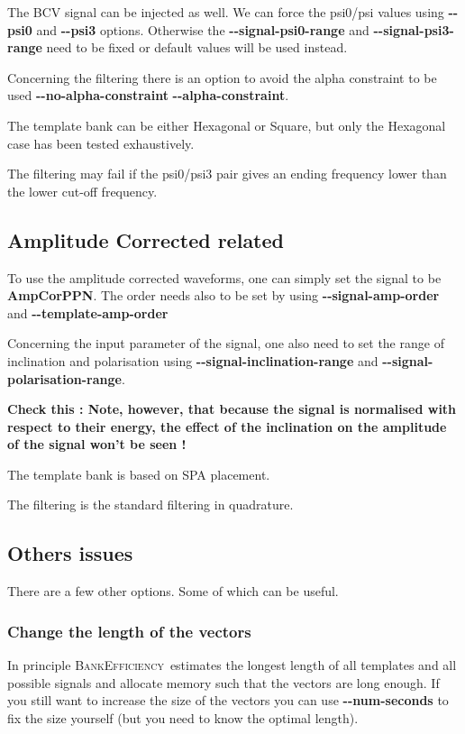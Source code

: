 \documentclass[a4paper,10pt]{article}
\newcommand{\be}{\textsc{BankEfficiency}~}
\begin{document}
The BCV signal can be injected as well. We can force the psi0/psi values using \textbf{{-}{-}psi0} and \textbf{{-}{-}psi3} options. 
Otherwise the \textbf{{-}{-}signal-psi0-range} and \textbf{{-}{-}signal-psi3-range} need to be fixed or default values will be used instead.

Concerning the filtering there is an option to avoid the alpha constraint to be used \textbf{{-}{-}no-alpha-constraint} \textbf{{-}{-}alpha-constraint}.

The template bank can be either Hexagonal or Square, but only the Hexagonal case has been tested exhaustively. 

The filtering may fail if the psi0/psi3 pair gives an ending frequency lower than the lower cut-off frequency. 

\subsection{Amplitude Corrected related}\label{ampcor}
To use the amplitude corrected waveforms, one can simply set the signal to be \textbf{AmpCorPPN}. The order needs also to be set by using \textbf{{-}{-}signal-amp-order}  and \textbf{{-}{-}template-amp-order}

Concerning the input parameter of the signal, one also need to set the range of inclination and polarisation using \textbf{{-}{-}signal-inclination-range} and \textbf{{-}{-}signal-polarisation-range}. 

\textbf{Check this : Note, however, that because the signal is normalised with respect to their energy, the effect of the inclination on the amplitude of the signal won't be seen !}

The template bank is based on SPA placement.

The filtering is the standard filtering in quadrature. 

\subsection{Others issues}\label{others}
There are a few other options. Some of which can be useful.
\subsubsection{Change the length of the vectors}
In principle \be estimates the longest length of all templates and all possible signals and allocate memory such that the vectors are long enough. If you still want to increase the size of the vectors  you can use \textbf{{-}{-}num-seconds} to fix the size yourself (but you need to know the optimal length).
\end{document}
